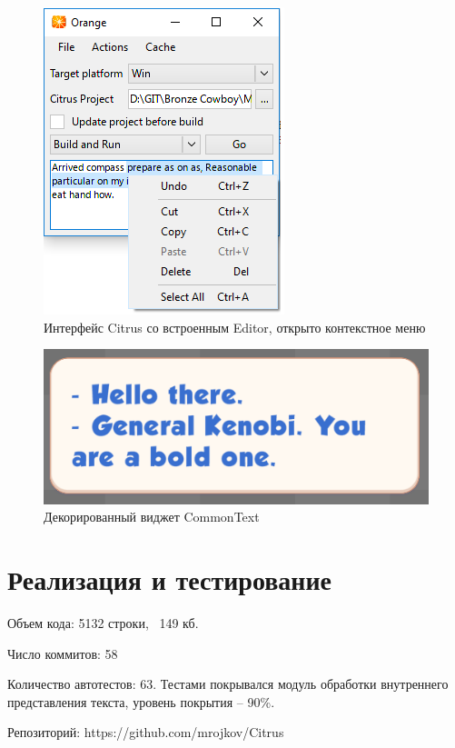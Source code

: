 \documentclass{fefu}
\begin{document}
			\begin{figure}[H]
				\centering
				\includegraphics[width=0.5\linewidth]{images/EditorContextMenu.png}
				\caption{Интерфейс Citrus со встроенным Editor, открыто контекстное меню}
			\end{figure}
			\begin{figure}[H]
				\centering
				\includegraphics[width=1\linewidth]{images/DecoratedBubble.png}
				\caption{Декорированный виджет CommonText}
			\end{figure}
	\section{Реализация и тестирование}
		\par Объем кода: 5132 строки, ~149 кб.
		\par Число коммитов: 58
		\par Количество автотестов: 63. Тестами покрывался модуль обработки внутреннего 
		представления текста, уровень покрытия -- 90\%.
		\par Репозиторий: https://github.com/mrojkov/Citrus
\end{document}
